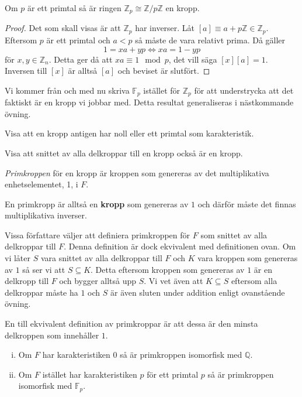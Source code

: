 \documentclass{article}
\theoremstyle{definition}
\begin{document}
\hypertarget{zpkropp}{}
\begin{mytheo}{}{}
  Om $p$ är ett primtal så är ringen $\mathbb{Z}_p \cong \mathbb{Z}/p\mathbb{Z}$ en kropp.
\end{mytheo}

\begin{proof}
  Det som skall visas är att $\mathbb{Z}_p$ har inverser. Låt $[a] \equiv a + p \mathbb{Z} \in \mathbb{Z}_p$. Eftersom $p$ är ett primtal och 
  $a < p$ så måste de vara relativt prima. Då gäller 
  \[ 1 = xa + yp  \iff xa = 1 - yp\]
  för $x, y \in \mathbb{Z}_n$. Detta ger då att $xa \equiv 1 \mod p$, det vill säga $[x][a] = 1$. Inversen till 
  $[x]$ är alltså $[a]$ och beviset är slutfört. 
\end{proof}
Vi kommer från och med nu skriva $\mathbb{F}_p$ istället för $\mathbb{Z}_p$ för att understrycka att det faktiskt är en kropp vi jobbar med.
Detta resultat generaliseras i nästkommande övning. 

\begin{ovning}{3}
  Visa att en kropp antigen har noll eller ett primtal som karakteristik. 
\end{ovning}

\begin{ovning}{4}
  Visa att snittet av alla delkroppar till en kropp också är en kropp. 
\end{ovning}

\begin{mydef}{}{}
  \textit{Primkroppen} för en kropp är kroppen som genereras av det multiplikativa enhetselementet, 1, i $F$.
\end{mydef}
En primkropp är alltså en \textbf{kropp} som genereras av $1$ och därför måste det finnas multiplikativa inverser.

Vissa författare väljer att definiera primkroppen för $F$ som snittet av alla delkroppar till $F$. Denna definition är dock ekvivalent med 
definitionen ovan. Om vi låter $S$ vara snittet av alla delkroppar till $F$ och $K$ vara kroppen som genereras av $1$ så ser vi att $S \subseteq K$. 
Detta eftersom 
kroppen som genereras av $1$ är en delkropp till $F$ och bygger alltså upp $S$. Vi vet även att $K \subseteq S$ eftersom alla delkroppar 
måste ha $1$ och $S$ är även sluten under addition enligt ovanstående övning. 

En till ekvivalent definition av primkroppar är att dessa är 
den minsta delkroppen som innehåller $1.$

\begin{mytheo}{}{}
  \begin{enumerate}[(i)]
    \item Om $F$ har karakteristiken $0$ så är primkroppen isomorfisk med $\mathbb{Q}$. 
    \item Om $F$ istället har karakteristiken $p$ för ett primtal $p$ så 
    är primkroppen isomorfisk med $\mathbb{F}_p.$
  \end{enumerate}
\end{mytheo}
\end{document}
